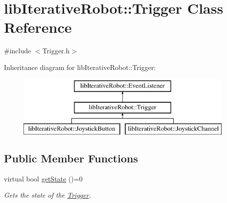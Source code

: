 \hypertarget{classlib_iterative_robot_1_1_trigger}{}\section{lib\+Iterative\+Robot\+::Trigger Class Reference}
\label{classlib_iterative_robot_1_1_trigger}


{\ttfamily \#include $<$Trigger.\+h$>$}

Inheritance diagram for lib\+Iterative\+Robot\+::Trigger\+:\begin{figure}[H]
\begin{center}
\leavevmode
\includegraphics[height=3.000000cm]{classlib_iterative_robot_1_1_trigger}
\end{center}
\end{figure}
\subsection*{Public Member Functions}
\begin{DoxyCompactItemize}
\item 
virtual bool \mbox{\hyperlink{classlib_iterative_robot_1_1_trigger_a785ea056a56974f2965c71fd0520bb87}{get\+State}} ()=0
\begin{DoxyCompactList}\small\item\em Gets the state of the \mbox{\hyperlink{classlib_iterative_robot_1_1_trigger}{Trigger}}. \end{DoxyCompactList}\end{DoxyCompactItemize}
